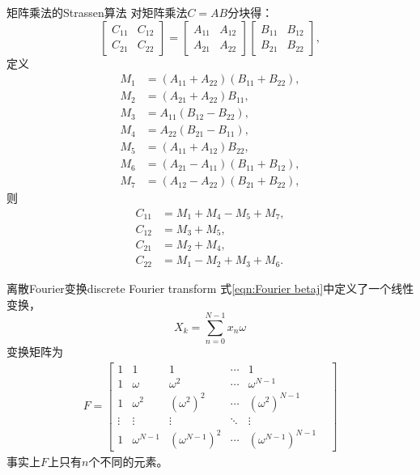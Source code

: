 \begin{theorem}
    {矩阵乘法的Strassen算法}{}
    对矩阵乘法$C=AB$分块得：
    \[
        \begin{bmatrix}
            C_{11}&C_{12}\\
            C_{21}&C_{22}
        \end{bmatrix}=\begin{bmatrix}
            A_{11}&A_{12}\\
            A_{21}&A_{22}
        \end{bmatrix}\begin{bmatrix}
            B_{11}&B_{12}\\
            B_{21}&B_{22}
        \end{bmatrix},
    \]
    定义 
    \begin{subequations}
        \begin{align}
            M_1&=(A_{11}+A_{22})(B_{11}+B_{22}),\\
            M_2&=(A_{21}+A_{22})B_{11},\\
            M_3&=A_{11}(B_{12}-B_{22}),\\
            M_4&=A_{22}(B_{21}-B_{11}),\\
            M_5&=(A_{11}+A_{12})B_{22},\\
            M_6&=(A_{21}-A_{11})(B_{11}+B_{12}),\\
            M_7&=(A_{12}-A_{22})(B_{21}+B_{22}),
        \end{align}
    \end{subequations}
    则
    \begin{subequations}
        \begin{align}
            C_{11}&=M_1+M_4-M_5+M_7,\\
            C_{12}&=M_3+M_5,\\
            C_{21}&=M_2+M_4,\\
            C_{22}&=M_1-M_2+M_3+M_6.
        \end{align}
    \end{subequations}
\end{theorem}

\begin{definition}
    {离散Fourier变换}{discrete Fourier transform}
    式\eqref{eqn:Fourier betaj}中定义了一个线性变换，
    \[
        X_k=\sum_{n=0}^{N-1}x_n\omega^{}
    \]
    变换矩阵为
    \begin{eqnarray}
        F=\begin{bmatrix}
            1&1&1&\cdots&1\\
            1&\omega&\omega^2&\cdots&\omega^{N-1}\\
            1&\omega^2&(\omega^2)^2&\cdots&(\omega^2)^{N-1}\\
            \vdots&\vdots&\vdots&\ddots&\vdots&\\
            1&\omega^{N-1}&(\omega^{N-1})^2&\cdots&(\omega^{N-1})^{N-1}
        \end{bmatrix}
    \end{eqnarray}
    事实上$F$上只有$n$个不同的元素。
\end{definition}
